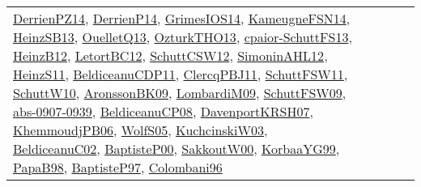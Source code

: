 {\begin{longtable}{lp{3cm}>{\raggedright}p{6cm}>{\raggedright}p{6cm}p{8cm}}
\href{papers/DerrienPZ14.pdf}{DerrienPZ14}\cite{DerrienPZ14}, \href{papers/DerrienP14.pdf}{DerrienP14}\cite{DerrienP14}, \href{articles/GrimesIOS14.pdf}{GrimesIOS14}\cite{GrimesIOS14}, \href{articles/KameugneFSN14.pdf}{KameugneFSN14}\cite{KameugneFSN14}, \href{articles/HeinzSB13.pdf}{HeinzSB13}\cite{HeinzSB13}, \href{papers/OuelletQ13.pdf}{OuelletQ13}\cite{OuelletQ13}, \href{articles/OzturkTHO13.pdf}{OzturkTHO13}\cite{OzturkTHO13}, \href{papers/cpaior-SchuttFS13.pdf}{cpaior-SchuttFS13}\cite{cpaior-SchuttFS13}, \href{papers/HeinzB12.pdf}{HeinzB12}\cite{HeinzB12}, \href{papers/LetortBC12.pdf}{LetortBC12}\cite{LetortBC12}, \href{papers/SchuttCSW12.pdf}{SchuttCSW12}\cite{SchuttCSW12}, \href{papers/SimoninAHL12.pdf}{SimoninAHL12}\cite{SimoninAHL12}, \href{papers/HeinzS11.pdf}{HeinzS11}\cite{HeinzS11}, \href{articles/BeldiceanuCDP11.pdf}{BeldiceanuCDP11}\cite{BeldiceanuCDP11}, \href{papers/ClercqPBJ11.pdf}{ClercqPBJ11}\cite{ClercqPBJ11}, \href{articles/SchuttFSW11.pdf}{SchuttFSW11}\cite{SchuttFSW11}, \href{papers/SchuttW10.pdf}{SchuttW10}\cite{SchuttW10}, \href{papers/AronssonBK09.pdf}{AronssonBK09}\cite{AronssonBK09}, \href{papers/LombardiM09.pdf}{LombardiM09}\cite{LombardiM09}, \href{papers/SchuttFSW09.pdf}{SchuttFSW09}\cite{SchuttFSW09}, \href{articles/abs-0907-0939.pdf}{abs-0907-0939}\cite{abs-0907-0939}, \href{papers/BeldiceanuCP08.pdf}{BeldiceanuCP08}\cite{BeldiceanuCP08}, \href{papers/DavenportKRSH07.pdf}{DavenportKRSH07}\cite{DavenportKRSH07}, \href{papers/KhemmoudjPB06.pdf}{KhemmoudjPB06}\cite{KhemmoudjPB06}, \href{papers/WolfS05.pdf}{WolfS05}\cite{WolfS05}, \href{articles/KuchcinskiW03.pdf}{KuchcinskiW03}\cite{KuchcinskiW03}, \href{papers/BeldiceanuC02.pdf}{BeldiceanuC02}\cite{BeldiceanuC02}, \href{articles/BaptisteP00.pdf}{BaptisteP00}\cite{BaptisteP00}, \href{articles/SakkoutW00.pdf}{SakkoutW00}\cite{SakkoutW00}, \href{papers/KorbaaYG99.pdf}{KorbaaYG99}\cite{KorbaaYG99}, \href{articles/PapaB98.pdf}{PapaB98}\cite{PapaB98}, \href{papers/BaptisteP97.pdf}{BaptisteP97}\cite{BaptisteP97}, \href{papers/Colombani96.pdf}{Colombani96}\cite{Colombani96}\\

\end{longtable}}
